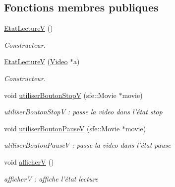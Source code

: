 \subsection*{Fonctions membres publiques}
\begin{DoxyCompactItemize}
\item 
\hypertarget{classEtatLectureV_a3d1e649e72665157198fb438169c09d7}{\hyperlink{classEtatLectureV_a3d1e649e72665157198fb438169c09d7}{Etat\+Lecture\+V} ()}\label{classEtatLectureV_a3d1e649e72665157198fb438169c09d7}

\begin{DoxyCompactList}\small\item\em Constructeur. \end{DoxyCompactList}\item 
\hyperlink{classEtatLectureV_af053295ec024e0afd1a08dfd861ec9a0}{Etat\+Lecture\+V} (\hyperlink{classVideo}{Video} $\ast$a)
\begin{DoxyCompactList}\small\item\em Constructeur. \end{DoxyCompactList}\item 
\hypertarget{classEtatLectureV_a9204aecf5df3dccc8414a3afb547c325}{void \hyperlink{classEtatLectureV_a9204aecf5df3dccc8414a3afb547c325}{utiliser\+Bouton\+Stop\+V} (sfe\+::\+Movie $\ast$movie)}\label{classEtatLectureV_a9204aecf5df3dccc8414a3afb547c325}

\begin{DoxyCompactList}\small\item\em utiliser\+Bouton\+Stop\+V \+: passe la video dans l'état stop \end{DoxyCompactList}\item 
\hypertarget{classEtatLectureV_a1ac75124b057cd5ffa4ad7aca3981cf4}{void \hyperlink{classEtatLectureV_a1ac75124b057cd5ffa4ad7aca3981cf4}{utiliser\+Bouton\+Pause\+V} (sfe\+::\+Movie $\ast$movie)}\label{classEtatLectureV_a1ac75124b057cd5ffa4ad7aca3981cf4}

\begin{DoxyCompactList}\small\item\em utiliser\+Bouton\+Pause\+V \+: passe la video dans l'état pause \end{DoxyCompactList}\item 
\hypertarget{classEtatLectureV_aeb97541e60e26c71a7053ae30dd78029}{void \hyperlink{classEtatLectureV_aeb97541e60e26c71a7053ae30dd78029}{afficher\+V} ()}\label{classEtatLectureV_aeb97541e60e26c71a7053ae30dd78029}

\begin{DoxyCompactList}\small\item\em afficher\+V \+: affiche l'état lecture \end{DoxyCompactList}\end{DoxyCompactItemize}


